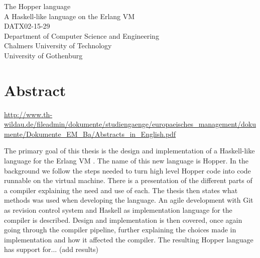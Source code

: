 The Hopper language\\
A Haskell-like language on the Erlang VM\\
DATX02-15-29\\
Department of Computer Science and Engineering\\
Chalmers University of Technology\\
University of Gothenburg\\

\thispagestyle{plain}			%
\section*{Abstract}



\url{http://www.th-wildau.de/fileadmin/dokumente/studiengaenge/europaeisches_management/dokumente/Dokumente_EM_Ba/Abstracts_in_English.pdf}







The primary goal of this thesis is the design and implementation of a Haskell-like language for the Erlang VM . The name of this new language is Hopper.
In the background we follow the steps needed to turn high level Hopper code into code runnable on the virtual machine. There is a presentation of the different parts of a compiler explaining the need and use of each. The thesis then states what methods was used when developing the language. An agile development with Git as revision control system and Haskell as implementation language for the compiler is described. Design and implementation is then covered, once again going through the compiler pipeline, further explaining the choices made in implementation and how it affected the compiler.
The resulting Hopper language has support for... (add results)

